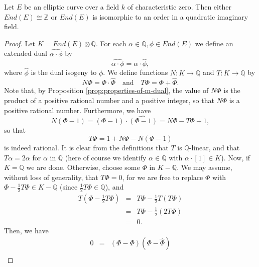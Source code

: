 \begin{thm}
  \label{thm:structure-thm-for-End(E)}
  Let $E$ be an elliptic curve over a field $k$ of characteristic zero.  Then either
  $End(E) \cong \mathbb{Z}$ or $End(E)$ is isomorphic to an order in a quadratic
  imaginary field.
\end{thm}
\begin{proof}
  Let $K = End(E) \otimes \mathbb{Q}$.  For each $\alpha \in \mathbb{Q}, \phi \in
  End(E)$ we define an extended dual $\widehat{\alpha \cdot \phi}$ by
  \begin{equation*}
    \widehat{\alpha \cdot \phi} = \alpha \cdot \widehat{\phi},
  \end{equation*}
  where $\widehat{\phi}$ is the dual isogeny to $\phi$.  We define functions $N : K
  \rightarrow \mathbb{Q}$ and $T : K \rightarrow \mathbb{Q}$ by
  \begin{equation*}
    N \Phi = \Phi \cdot \widehat{\Phi} \quad \text{and} \quad T \Phi = \Phi + \widehat{\Phi}.
  \end{equation*}
  Note that, by Proposition \ref{prop:properties-of-m-dual}, the value of $N \Phi$ is
  the product of a positive rational number and a positive integer, so that $N \Phi$
  is a positive rational number.  Furthermore, we have
  \begin{equation*}
    N(\Phi - 1) = (\Phi - 1) \cdot \widehat{(\Phi - 1)} = N\Phi - T\Phi + 1,
  \end{equation*}
  so that
  \begin{equation*}
    T\Phi = 1 + N\Phi - N(\Phi - 1)
  \end{equation*}
  is indeed rational.  It is clear from the definitions that $T$ is
  $\mathbb{Q}$-linear, and that $T\alpha = 2\alpha$ for $\alpha$ in $\mathbb{Q}$
  (here of course we identify $\alpha \in \mathbb{Q}$ with $\alpha \cdot [1] \in K$).
  Now, if $K = \mathbb{Q}$ we are done.  Otherwise, choose some $\Phi$ in $K -
  \mathbb{Q}$.  We may assume, without loss of generality, that $T\Phi = 0$, for we
  are free to replace $\Phi$ with $\Phi - \frac{1}{2}T\Phi \in K - \mathbb{Q}$ (since
  $\frac{1}{2}T\Phi \in \mathbb{Q}$), and
  \begin{eqnarray*}
    T(\Phi - \frac{1}{2}T\Phi)&=&T \Phi - \frac{1}{2} T (T\Phi)\\
    &=&T \Phi - \frac{1}{2}(2T \Phi)\\
    &=&0.
  \end{eqnarray*}
  Then, we have
  \begin{eqnarray*}
    0&=&(\Phi - \Phi)(\Phi - \widehat{\Phi})\\

\end{eqnarray*}
\end{proof}
